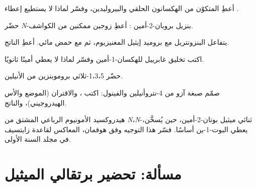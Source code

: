 \begin{exercise}[$\star\star$]\label{exo:b2:amines:6}
أعطِ  المتكوّن من الهكسانون الحلقي والبيروليدين، وفسّر لماذا لا يستطيع 
إعطاء .
\end{exercise}

\begin{exercise}[$\star\star$]\label{exo:b2:amines:7}
حضّر \textit{N}-بنزيل بروبان-2-أمين  : أعطِ زوجين
ممكنين من الكواشف.
\end{exercise}

\begin{exercise}[$\star\star$]\label{exo:b2:amines:8}
يتفاعل البنزونتريل مع بروميد إيثيل المغنيزيوم، ثم مع حمض مائي. أعطِ الناتج.
\end{exercise}

\begin{exercise}[$\star\star$]\label{exo:b2:amines:9}
اكتب تخليق غابرييل للهكسان-1-أمين وفسّر لماذا لا يعطي أمينًا ثانويًا.
\end{exercise}

\begin{exercise}[$\star\star\star$]\label{exo:b2:amines:10}
حضّر 1،3،5-ثلاثي بروموبنزين من الأنيلين.
\end{exercise}

\begin{exercise}[$\star\star\star$]\label{exo:b2:amines:11}
صمّم صبغة آزو من 4-نتروأنيلين والفينول: اكتب ، والاقتران (الموضع
والأس الهيدروجيني)، والناتج.
\end{exercise}

\begin{exercise}[$\star\star\star$]\label{exo:b2:amines:12}
هيدروكسيد الأمونيوم الرباعي المشتق من \textit{N}،\textit{N}-ثنائي ميثيل بوتان-2-أمين، حين يُسخَّن، يعطي
البوت-1-ين أساسًا. فسّر هذا التوجيه وفق هوفمان، المعاكس لقاعدة زايتسيف في مجلد السنة
الأولى.
\end{exercise}

\section{مسألة: تحضير برتقالي الميثيل}

